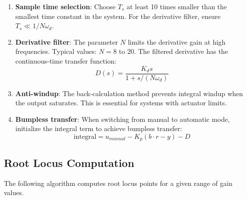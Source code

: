 \begin{enumerate}
    \item \textbf{Sample time selection}: Choose $T_s$ at least 10 times smaller than the smallest time constant in the system. For the derivative filter, ensure $T_s \ll 1/N\omega_d$.

    \item \textbf{Derivative filter}: The parameter $N$ limits the derivative gain at high frequencies. Typical values: $N = 8$ to $20$. The filtered derivative has the continuous-time transfer function:
    \begin{equation}
    D(s) = \frac{K_d s}{1 + s/(N\omega_d)}
    \end{equation}

    \item \textbf{Anti-windup}: The back-calculation method prevents integral windup when the output saturates. This is essential for systems with actuator limits.

    \item \textbf{Bumpless transfer}: When switching from manual to automatic mode, initialize the integral term to achieve bumpless transfer:
    \begin{equation}
    \text{integral} = u_{manual} - K_p(b \cdot r - y) - D
    \end{equation}
\end{enumerate}

\subsection{Root Locus Computation}
\label{subsec:root_locus_algorithm}

The following algorithm computes root locus points for a given range of gain values.

